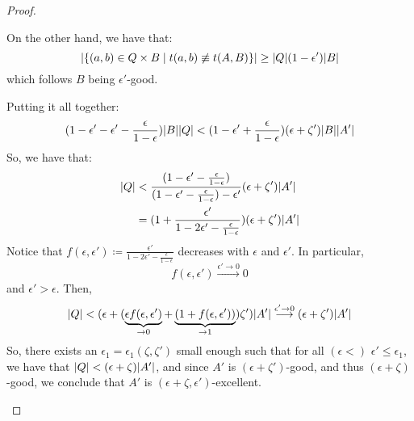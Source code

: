 \begin{lemma}[Claim 5.13]
\begin{proof}
\begin{enumerate}[label=(\alph*), ref=\alph*]
                On the other hand, we have that:
                \[
                    | \{ (a,b) \in Q \times B \mid t(a, b) \not\equiv t(A, B) \} | \geq
                    | Q | ( 1 - \epsilon' ) | B |
                \]
                which follows $B$ being $\epsilon'$-good.

                Putting it all together:
                \[
                    ( 1 - \epsilon' - \epsilon' - \frac{\epsilon}{1 - \epsilon} ) | B | | Q | <
                    ( 1 - \epsilon' + \frac{\epsilon}{1 - \epsilon} ) ( \epsilon + \zeta' ) | B | | A' |
                \]
                So, we have that:
                \begin{align*}
                    | Q | & < \frac{( 1 - \epsilon' - \frac{\epsilon}{1 - \epsilon} )}
                                        {( 1 - \epsilon' - \frac{\epsilon}{1 - \epsilon} ) - \epsilon'}
                                        ( \epsilon + \zeta' ) | A' | \\
                                    & = ( 1 + \frac{\epsilon'}{1 - 2\epsilon' - \frac{\epsilon}{1 - \epsilon}} )
                                        (\epsilon + \zeta') |A'|
                \end{align*}
                Notice that $f(\epsilon, \epsilon') \coloneqq \frac{\epsilon'}{1 - 2\epsilon' - \frac{\epsilon}{1 - \epsilon}}$
                decreases with $\epsilon$ and $\epsilon'$.
                In particular,
                \[
                    f(\epsilon, \epsilon') \overset{\epsilon' \to 0}{\longrightarrow} 0
                \]
                and $\epsilon' > \epsilon$.
                Then,
                \[
                    | Q | < ( \epsilon + ( \underbrace{\epsilon f(\epsilon, \epsilon')}_{\to 0} +
                    \underbrace{( 1 + f(\epsilon, \epsilon') )}_{\to 1} ) \zeta' ) |A'|
                    \overset{\epsilon' \to 0}{\longrightarrow} ( \epsilon + \zeta' ) |A'|
                \]
                So, there exists an $\epsilon_1 = \epsilon_1(\zeta, \zeta')$ small enough such that for all
                $(\epsilon <)$ $\epsilon' \leq \epsilon_1$, we have that $| Q | < ( \epsilon + \zeta ) |A'|$,
                and since $A'$ is $(\epsilon + \zeta')$-good, and thus $(\epsilon + \zeta)$-good, we conclude that
                $A'$ is $(\epsilon + \zeta, \epsilon')$-excellent. 

\end{enumerate}
\end{proof}
\end{lemma}
